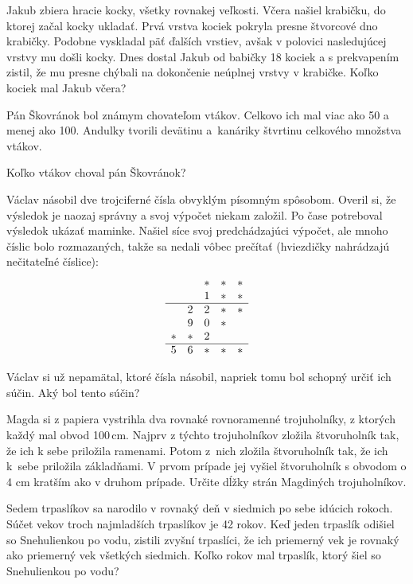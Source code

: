 {%
Jakub zbiera hracie kocky, všetky rovnakej veľkosti.
Včera našiel krabičku, do ktorej začal kocky ukladať.
Prvá vrstva kociek pokryla presne štvorcové dno krabičky.
Podobne vyskladal päť ďalších vrstiev, avšak v polovici nasledujúcej vrstvy mu došli kocky.
Dnes dostal Jakub od babičky 18 kociek a s prekvapením zistil, že mu presne chýbali na dokončenie neúplnej vrstvy v krabičke.
Koľko kociek mal Jakub včera?}

{%
Pán Škovránok bol známym chovateľom vtákov.
Celkovo ich mal viac ako 50 a menej ako 100.
Andulky tvorili devätinu a~kanáriky štvrtinu celkového množstva vtákov.

Koľko vtákov choval pán Škovránok?}

{%
Václav násobil dve trojciferné čísla obvyklým písomným spôsobom.
Overil si, že výsledok je naozaj správny a svoj výpočet niekam založil.
Po čase potreboval výsledok ukázať maminke.
Našiel síce svoj predchádzajúci výpočet, ale mnoho číslic bolo rozmazaných, takže sa nedali vôbec prečítať (hviezdičky nahrádzajú nečitateľné číslice):
$$
\begin{array}{ccccc}
 & & * & * & * \\
 & & 1 & * & * \\
\hline
 & 2 & 2 & * & * \\
 & 9 & 0 & * & \\
* & * & 2 & & \\
\hline
5 & 6 & * & * & * \\
\end{array}
$$

Václav si už nepamätal, ktoré čísla násobil, napriek tomu bol schopný určiť ich súčin.
Aký bol tento súčin?}

{%
Magda si z papiera vystrihla dva rovnaké rovnoramenné trojuholníky, z ktorých každý mal obvod 100\,cm.
Najprv z týchto trojuholníkov zložila štvoruholník tak, že ich k sebe priložila ramenami.
Potom z~nich zložila štvoruholník tak, že ich k~sebe priložila základňami.
V prvom prípade jej vyšiel štvoruholník s obvodom o 4 cm kratším ako v druhom prípade.
Určite dĺžky strán Magdiných trojuholníkov.
%
}

{%
Sedem trpaslíkov sa narodilo v rovnaký deň v siedmich po sebe idúcich rokoch.
Súčet vekov troch najmladších trpaslíkov je 42 rokov.
Keď jeden trpaslík odišiel so Snehulienkou po vodu, zistili zvyšní trpaslíci, že ich priemerný vek je rovnaký ako priemerný vek všetkých siedmich.
Koľko rokov mal trpaslík, ktorý šiel so Snehulienkou po vodu?}

